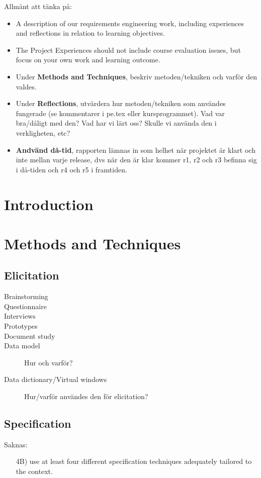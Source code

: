 \documentclass[10pt,a4paper]{article}
\author{Linnéa Claesson}
\begin{document}
{\huge Allmänt att tänka på:}
\begin{itemize}
\item A description of our requirements engineering work, including experiences and reflections in relation to learning objectives.
\item The Project Experiences should not include course evaluation issues, but focus on your own work and learning outcome.
\item Under \textbf{Methods and Techniques}, beskriv metoden/tekniken och varför den valdes.
\item Under \textbf{Reflections}, utvärdera hur metoden/tekniken som användes fungerade (se kommentarer i pe.tex eller kursprogrammet). Vad var bra/dåligt med den? Vad har vi lärt oss? Skulle vi använda den i verkligheten, etc?
\item \textbf{Andvänd då-tid}, rapporten lämnas in som helhet när projektet är klart och inte mellan varje release, dvs när den är klar kommer r1, r2 och r3 befinna sig i då-tiden och r4 och r5 i framtiden.
\end{itemize}


\section{Introduction}

\section{Methods and Techniques}
\subsection{Elicitation}
\begin{description}
\item[Brainstorming] 
\item[Questionnaire]
\item[Interviews]
\item[Prototypes]
\item[Document study]
\item[Data model] Hur och varför?
\item[Data dictionary/Virtual windows] Hur/varför användes den för elicitation?
\end{description}

\subsection{Specification}
{\Large Saknas:}
\begin{itemize}
\item[4B)] use at least four different specification techniques adequately tailored to the context.
\end{itemize}
\end{document}
